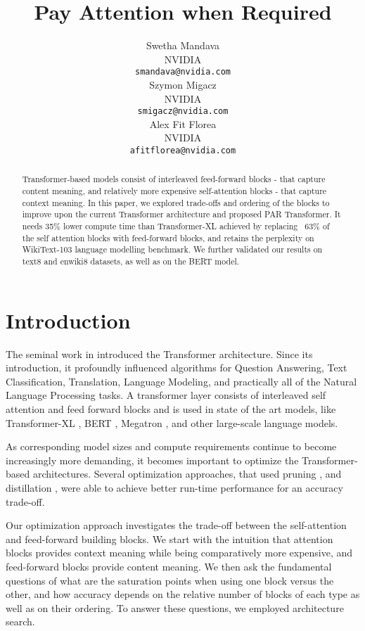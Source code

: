 \documentclass{article}
\title{Pay Attention when Required}
\author{
  Swetha Mandava\\
  NVIDIA \\
  \texttt{smandava@nvidia.com} \\
\And
  Szymon Migacz \\
  NVIDIA \\
  \texttt{smigacz@nvidia.com} \\
\And
  Alex Fit Florea \\
  NVIDIA \\
  \texttt{afitflorea@nvidia.com} \\
}
\begin{document}
\maketitle

\begin{abstract}

Transformer-based models consist of interleaved feed-forward blocks - that capture content meaning, and relatively more expensive self-attention blocks - that capture context meaning. In this paper, we explored trade-offs and ordering of the blocks to improve upon the current Transformer architecture and proposed PAR Transformer. It needs 35\% lower compute time than Transformer-XL achieved by replacing ~63\% of the self attention blocks with feed-forward blocks, and retains the perplexity on WikiText-103 language modelling benchmark. We further validated our results on text8 and enwiki8 datasets, as well as on the BERT model.

\end{abstract}


\section{Introduction}

The seminal work in \cite{attention} introduced the Transformer architecture. Since its introduction, it profoundly influenced algorithms for Question Answering, Text Classification, Translation, Language Modeling, and practically all of the Natural Language Processing tasks. A transformer layer consists of interleaved self attention and feed forward blocks and is used in state of the art models, like Transformer-XL \cite{TXL}, BERT \cite{bert}, Megatron \cite{megatron}, and other large-scale language models.

As corresponding model sizes and compute requirements continue to become increasingly more demanding, it becomes important to optimize the Transformer-based architectures. Several optimization approaches, that used pruning \cite{droppingheads}, and distillation \cite{distilbert}, were able to achieve better run-time performance for an accuracy trade-off. 

Our optimization approach investigates the trade-off between the self-attention and feed-forward building blocks. We start with the intuition that attention blocks provides context meaning while being comparatively more expensive, and feed-forward blocks provide content meaning. We then ask the fundamental questions of what are the saturation points when using one block versus the other, and how accuracy depends on the relative number of blocks of each type as well as on their ordering. To answer these questions, we employed architecture search. 
\end{document}
